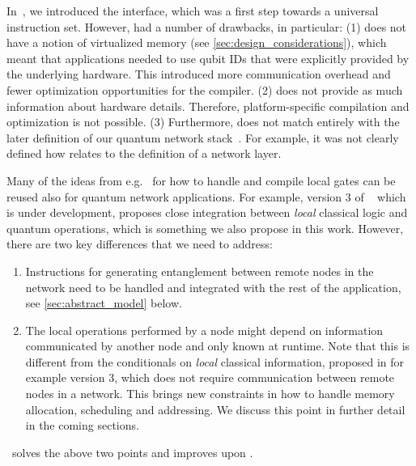 In~\cite{dahlberg2018simulaqron}, we introduced the \cqc interface, which was a first step towards a universal instruction set.
However, \cqc had a number of drawbacks, in particular:
    (1) \cqc does not have a notion of virtualized memory (see \cref{sec:design_considerations}), which meant that applications needed to use qubit IDs that were explicitly provided by the underlying hardware.
        This introduced more communication overhead and fewer optimization opportunities for the compiler.
    (2) \cqc does not provide as much information about hardware details.
        Therefore, platform-specific compilation and optimization is not possible.
    (3) Furthermore, \cqc does not match entirely with the later definition of our quantum network stack~\cite{dahlberg2019linklayer, kozlowski2020networklayer}.
        For example, it was not clearly defined how \cqc relates to the definition of a network layer.

Many of the ideas from e.g. \qasm\ for how to handle and compile local gates can be reused also for quantum network applications.
For example, version 3 of \openqasm~\cite{cross2021openqasm} which is under development, proposes close integration between \emph{local} classical logic and quantum operations, which is something we also propose in this work.
However, there are two key differences that we need to address:
\begin{enumerate}
      \item Instructions for generating entanglement between remote nodes in the network need to be handled and integrated with the rest of the application, see \cref{sec:abstract_model} below.
      \item The local operations performed by a node might depend on information communicated by another node and only known at runtime.
            Note that this is different from the conditionals on \emph{local} classical information, proposed in for example \openqasm version 3, which does not require communication between remote nodes in a network.
            This brings new constraints in how to handle memory allocation, scheduling and addressing.
            We discuss this point in further detail in the coming sections.
\end{enumerate}
\netqasm\ solves the above two points and improves upon \cqc.


